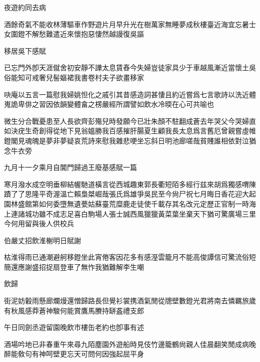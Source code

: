\documentclass{zhvt-classic-Miya}
\begin{document}
\begin{fw}夜遊約同去病\end{fw}

酒餘奇氣不能收林薄驅車作野遊片月早升光在樹萬家無睡夢成秋樓臺近海宜忘暑士女圍鐙不解愁難遣近來懷抱惡悽然越謾復吳謳

\begin{fw}移居吳下感賦\end{fw}

已忘門外卽天涯僦舍初安靜不譁太息賃舂今失婦豈徒家具少于車越風漸近當懷土吳俗能知可戒奢兒髻嫗裙我書卷村夫子欲畫移家

\begin{fw}吷庵以五言一篇慰我婦姚怛化之戚引其昔感造詞甚悽且約近嘗爲七言歌詩以洗近體嵬詭卑俳之習因依韻變體畣之楞嚴經所謂譬如飲水冷㬉在心可共喻也\end{fw}

微生分合戰憂患至人長欲齊彭殤兒時發願今已壯朱顏不駐翻成蒼去年哭父今哭婦直如決疣生奇創得從地下見翁媼勝我百感摧肝腸夏生顧我長太息爲言舊厄曾親嘗虛帷鐙閣見魂魄是夢非夢疑哀荒詩來慰我雜悲哽坐忘斜日明池廊嗟哉貧賤誰相依對泣猶念牛衣旁

\begin{fw}九月十一夕乘月自閶門歸過王廢基感賦一篇\end{fw}

寒月潑水成空明垂柳結幄馳道橫言從西城趣東郭長衢短陌多經行兹來胡爲獨感喟陳蹟了了思隆平奇渥溫亡賴梟桀崛哉張氏爲雄爭吳民至今尙尸祝七月晦日香花迎大起園林盛館第如何委墮無遺甍姑蘇臺荒糜鹿走徒使千載存其名改元定歷正官制一時海上連諸城功雖不成志足喜白駒場人張士誠西風獵獵黃菜葉坐棄天下猶可驚廣場三里今何用留與後人供校兵

\begin{fw}伯嚴丈招飲淮榭明日賦謝\end{fw}

枯淮得雨已通潮避舸移鐙坐此宵倦客因花多有感溼雲籠月不能高俊譚信可驚流俗短簡還應謝盛招捉扇登車了無怍我猶難解李生嘲

\begin{fw}飲歸\end{fw}

街泥妨轂雨懸廊爛熳還憎歸路長但覺衫裳携酒氣閒從牕壁數鐙光君將南去憐羈旅歲有秋風感莽蒼神駿何能賞鷹馬賸持缾盋禮支郎

\begin{fw}午日同劍丞遊留園晚飲市樓缶老約也卽事有述\end{fw}

酒場吟地已非春重午來尋九陌塵園外遊船時見伎竹邊籠鶴尙親人佳晨翻笑閒成病晚醉能敎句有神呵壁更忘天可問何因強起屈平身
\end{document}
